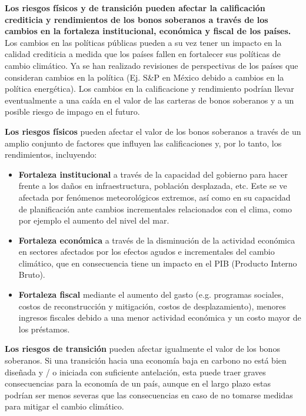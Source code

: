 \documentclass[10pt,table]{article}\usepackage[]{graphicx}\usepackage[]{color}
\begin{document}
	\begin{multicols}{2}
	
	\textbf{Los riesgos físicos y de transición pueden afectar la calificación crediticia y rendimientos de los bonos soberanos a través de los cambios en la fortaleza institucional, económica y fiscal de los países.} Los cambios en las políticas públicas pueden a su vez tener un impacto en la calidad crediticia a medida que los países fallen en fortalecer sus políticas de cambio climático. Ya se han realizado revisiones de perspectivas de los países que consideran cambios en la política (Ej. S\&P en México debido a cambios en la política energética). Los cambios en la calificacione y rendimiento podrían llevar eventualmente a una caída en el valor de las carteras de bonos soberanos y a un  posible riesgo de impago en el futuro. 
	
	
	\textbf{Los riesgos físicos} pueden afectar el valor de los bonos soberanos a través de un amplio conjunto de factores que influyen las calificaciones y, por lo tanto, los rendimientos, incluyendo:
	
		\begin{itemize}
	\item{\textbf{Fortaleza institucional} a través de la capacidad del gobierno para hacer frente a los daños en infraestructura, población desplazada, etc. Este se ve afectada por fenómenos meteorológicos extremos, así como en su capacidad de planificación ante cambios incrementales relacionados con el clima, como por ejemplo el aumento del nivel del mar.}
	\item{\textbf{Fortaleza económica } a través de la disminución de la actividad económica en sectores afectados por los efectos agudos e incrementales del cambio climático, que en consecuencia tiene un impacto en el PIB (Producto Interno Bruto).}
	\item{\textbf{Fortaleza fiscal }mediante el aumento del gasto (e.g. programas sociales, costos de reconstrucción y mitigación, costos de desplazamiento), menores ingresos fiscales debido a una menor actividad económica y un costo mayor de los préstamos.}
		\end{itemize}
	
	\textbf{Los riesgos de transición} pueden afectar igualmente el valor de los bonos soberanos.  Si una transición hacia una economía  baja en carbono no está bien diseñada y / o iniciada con suficiente antelación, esta puede traer graves consecuencias para la economía de un país, aunque en el largo plazo estas podrían ser menos severas que las consecuencias en caso de no tomarse medidas para mitigar el cambio climático.
	

\end{multicols}
\end{document}
